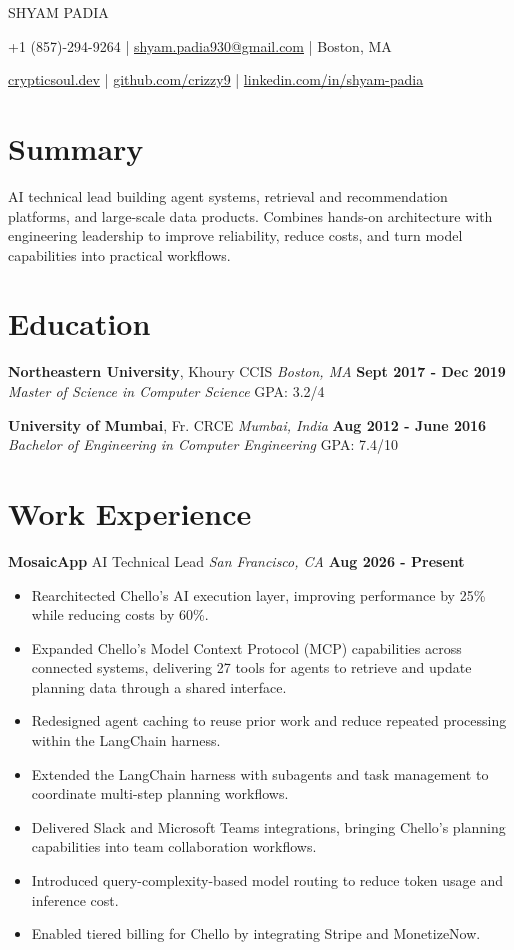 \documentclass[10pt, letterpaper]{article}
\newcommand{\name}[1]{\centerline{\Large \scshape {#1}}}
\newcommand{\contactinfo}[1]{\centerline{\small #1}}
\newcommand{\educationentry}[4]{
  \noindent\textbf{#1}, #2 \hfill \textit{#3} \hfill \textbf{#4}
}
\newcommand{\jobentry}[4]{
  \noindent\textbf{#1} \hfill #2 \hfill \textit{#3} \hfill \textbf{#4}
}
\begin{document}
\name{SHYAM PADIA}
\contactinfo{
	+1 (857)-294-9264 |
	\href{mailto:shyam.padia930@gmail.com}{shyam.padia930@gmail.com} |
	Boston, MA
}
\contactinfo{
	\href{https://crypticsoul.dev}{crypticsoul.dev} |
	\href{https://github.com/crizzy9}{github.com/crizzy9} |
	\href{https://linkedin.com/in/shyam-padia}{linkedin.com/in/shyam-padia}
}

\section{Summary}
AI technical lead building agent systems, retrieval and recommendation platforms, and large-scale data products. Combines hands-on architecture with engineering leadership to improve reliability, reduce costs, and turn model capabilities into practical workflows.

\section{Education}

\educationentry{Northeastern University}{Khoury CCIS}{Boston, MA}{Sept 2017 - Dec 2019}\\
\textit{Master of Science in Computer Science} \hfill GPA: 3.2/4


\educationentry{University of Mumbai}{Fr. CRCE}{Mumbai, India}{Aug 2012 - June 2016}\\
\textit{Bachelor of Engineering in Computer Engineering} \hfill GPA: 7.4/10

\section{Work Experience}

\jobentry{MosaicApp}{AI Technical Lead}{San Francisco, CA}{Aug 2026 - Present}
\begin{itemize}
\item Rearchitected Chello's AI execution layer, improving performance by 25\% while reducing costs by 60\%.
\item Expanded Chello's Model Context Protocol (MCP) capabilities across connected systems, delivering 27 tools for agents to retrieve and update planning data through a shared interface.
\item Redesigned agent caching to reuse prior work and reduce repeated processing within the LangChain harness.
\item Extended the LangChain harness with subagents and task management to coordinate multi-step planning workflows.
\item Delivered Slack and Microsoft Teams integrations, bringing Chello's planning capabilities into team collaboration workflows.
\item Introduced query-complexity-based model routing to reduce token usage and inference cost.
\item Enabled tiered billing for Chello by integrating Stripe and MonetizeNow.
\end{itemize}
\end{document}
